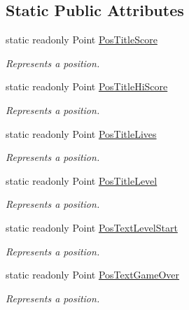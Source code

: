 \subsection*{Static Public Attributes}
\begin{DoxyCompactItemize}
\item 
static readonly Point \mbox{\hyperlink{class_o_e_invaders_1_1_logic_1_1_game_logic_a79500c4c789914e1ae746717856e573c}{Pos\+Title\+Score}}
\begin{DoxyCompactList}\small\item\em Represents a position. \end{DoxyCompactList}\item 
static readonly Point \mbox{\hyperlink{class_o_e_invaders_1_1_logic_1_1_game_logic_a6a37cfbd564991f0714163bc72e3df31}{Pos\+Title\+Hi\+Score}}
\begin{DoxyCompactList}\small\item\em Represents a position. \end{DoxyCompactList}\item 
static readonly Point \mbox{\hyperlink{class_o_e_invaders_1_1_logic_1_1_game_logic_a276c8f3bed6d8894ccf2873cc8fdec56}{Pos\+Title\+Lives}}
\begin{DoxyCompactList}\small\item\em Represents a position. \end{DoxyCompactList}\item 
static readonly Point \mbox{\hyperlink{class_o_e_invaders_1_1_logic_1_1_game_logic_a8b1a55250f2db1c3d9244e03c2f4498f}{Pos\+Title\+Level}}
\begin{DoxyCompactList}\small\item\em Represents a position. \end{DoxyCompactList}\item 
static readonly Point \mbox{\hyperlink{class_o_e_invaders_1_1_logic_1_1_game_logic_a4ffe5a8bdabf0995075b3318edc34fe6}{Pos\+Text\+Level\+Start}}
\begin{DoxyCompactList}\small\item\em Represents a position. \end{DoxyCompactList}\item 
static readonly Point \mbox{\hyperlink{class_o_e_invaders_1_1_logic_1_1_game_logic_a681b19251ed1a2491dcfd0de6b8970f3}{Pos\+Text\+Game\+Over}}
\begin{DoxyCompactList}\small\item\em Represents a position. \end{DoxyCompactList}\item 

\end{DoxyCompactItemize}
